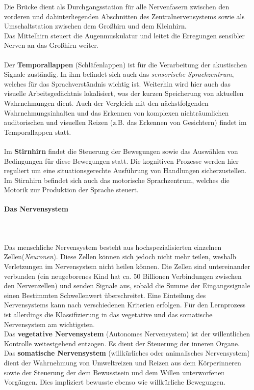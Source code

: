 Die Brücke dient als Durchgangsstation für alle Nervenfasern zwischen den vorderen und dahinterliegenden Abschnitten des Zentralnervensystems sowie als Umschaltstation zwischen dem Großhirn und dem Kleinhirn.\\
Das Mittelhirn steuert die Augenmuskulatur und leitet die Erregungen sensibler Nerven an das Großhirn weiter.\\
\\
Der {\bf Temporallappen} (Schläfenlappen) ist für die Verarbeitung der akustischen Signale zuständig. In ihm befindet sich auch das {\it sensorische Sprachzentrum}, welches für das Sprachverständnis wichtig ist. Weiterhin wird hier auch das visuelle Arbeitsgedächtnis lokalisiert, was der kurzen Speicherung von aktuellen Wahrnehmungen dient. Auch der Vergleich mit den nächstfolgenden Wahrnehmungsinhalten und das Erkennen von komplexen nichträumlichen auditorischen und visuellen Reizen (z.B. das Erkennen von Gesichtern) findet im Temporallappen statt.\\
\\
Im {\bf Stirnhirn} findet die Steuerung der Bewegungen sowie das Auswählen von Bedingungen für diese Bewegungen statt. Die kognitiven Prozesse werden hier reguliert um eine situationsgerechte Ausführung von Handlungen sicherzustellen. Im Stirnhirn befindet sich auch das motorische Sprachzentrum, welches die Motorik zur Produktion der Sprache steuert.\\
\paragraph{Das Nervensystem}~\\
\\
Das menschliche Nervensystem besteht aus hochspezialisierten einzelnen Zellen({\it Neuronen}). Diese Zellen können sich jedoch nicht mehr teilen, weshalb Verletzungen im Nervensystem nicht heilen können. Die Zellen sind untereinander verbunden (ein neugeborenes Kind hat ca. 50 Billionen Verbindungen zwischen den Nervenzellen) und senden Signale aus, sobald die Summe der Eingangssignale einen Bestimmten Schwellenwert überschreitet. Eine Einteilung des Nervensystems kann nach verschiedenen Kriterien erfolgen. Für den Lernprozess ist allerdings die Klassifizierung in das vegetative und das somatische Nervensystem am wichtigsten.\\
Das {\bf vegetative Nervensystem} (Autonomes Nervensystem) ist der willentlichen Kontrolle weitestgehend entzogen. Es dient der Steuerung der inneren Organe.\\
Das {\bf somatische Nervensystem} (willkürliches oder animalisches Nervensystem) dient der Wahrnehmung von Umweltreizen und Reizen aus dem Körperinneren sowie der Steuerung der dem Bewusstsein und dem Willen unterworfenen Vorgängen. Dies impliziert bewusste ebenso wie willkürliche Bewegungen.\\

